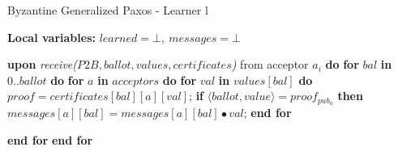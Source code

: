 \begin{algorithm}
	\caption{Byzantine Generalized Paxos - Learner l}
	\label{BFT-Learn}
	\textbf{Local variables: } $learned = \bot,\ messages = \bot$ 
	\begin{algorithmic}[1]
		\State \textbf{upon} \textit{receive($P2B, ballot, values, certificates$)} from acceptor $a_i$ \textbf{do}
		\State \hspace{\algorithmicindent} \textbf{for} $bal$ \textbf{in} $0..ballot$ \textbf{do}
		\State \hspace{\algorithmicindent}\hspace{\algorithmicindent} \textbf{for} $a$ \textbf{in} $acceptors$ \textbf{do} 
		\State \hspace{\algorithmicindent}\hspace{\algorithmicindent}\hspace{\algorithmicindent} \textbf{for} $val$ \textbf{in} $values[bal]$ \textbf{do} 
		\State \hspace{\algorithmicindent}\hspace{\algorithmicindent}\hspace{\algorithmicindent}\hspace{\algorithmicindent} $proof = certificates[bal][a][val]$;
		\State \hspace{\algorithmicindent}\hspace{\algorithmicindent}\hspace{\algorithmicindent}\hspace{\algorithmicindent} \textbf{if} $\langle ballot, value \rangle = proof_{pub_a}$ \textbf{then}
		\State \hspace{\algorithmicindent}\hspace{\algorithmicindent}\hspace{\algorithmicindent}\hspace{\algorithmicindent}\hspace{\algorithmicindent} $messages[a][bal] =messages[a][bal] \bullet val$;
		\State \hspace{\algorithmicindent}\hspace{\algorithmicindent}\hspace{\algorithmicindent} \textbf{end for}
		
		\State \hspace{\algorithmicindent}\hspace{\algorithmicindent} \textbf{end for}
		\State \hspace{\algorithmicindent} \textbf{end for}
		

\end{algorithmic}
\end{algorithm}
